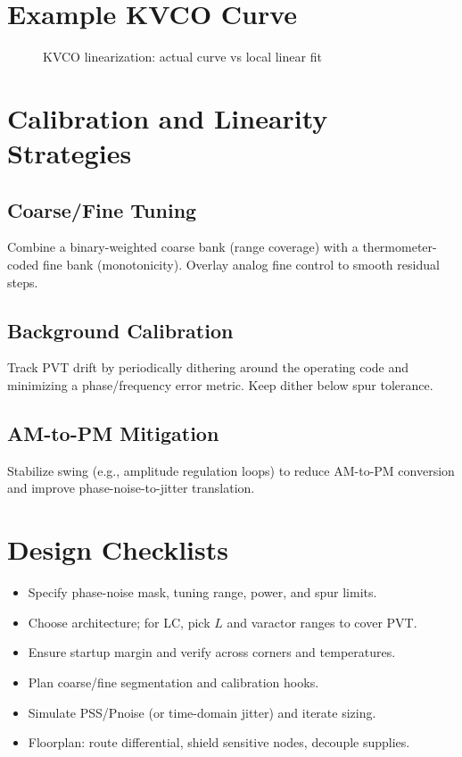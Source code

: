 \section{Example KVCO Curve}
\begin{figure}[H]
  \centering
  \caption{KVCO linearization: actual curve vs local linear fit}
\end{figure}

\section{Calibration and Linearity Strategies}
\subsection*{Coarse/Fine Tuning}
Combine a binary-weighted coarse bank (range coverage) with a thermometer-coded fine bank (monotonicity). Overlay analog fine control to smooth residual steps.
\subsection*{Background Calibration}
Track PVT drift by periodically dithering around the operating code and minimizing a phase/frequency error metric. Keep dither below spur tolerance.
\subsection*{AM-to-PM Mitigation}
Stabilize swing (e.g., amplitude regulation loops) to reduce AM-to-PM conversion and improve phase-noise-to-jitter translation.

\section{Design Checklists}
\begin{itemize}
  \item Specify phase-noise mask, tuning range, power, and spur limits.
  \item Choose architecture; for LC, pick \(L\) and varactor ranges to cover PVT.
  \item Ensure startup margin and verify across corners and temperatures.
  \item Plan coarse/fine segmentation and calibration hooks.
  \item Simulate PSS/Pnoise (or time-domain jitter) and iterate sizing.
  \item Floorplan: route differential, shield sensitive nodes, decouple supplies.
\end{itemize}


